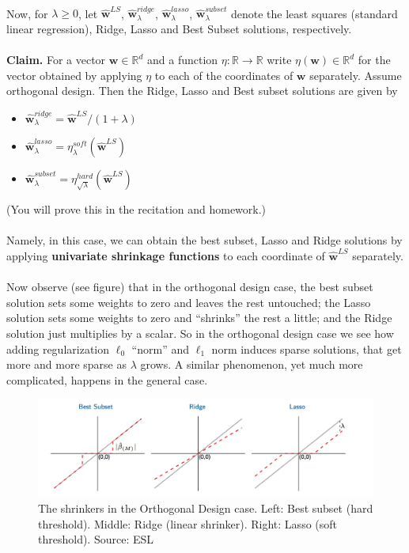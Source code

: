 \documentclass[11pt]{article}
\newcommand{\R}{\ensuremath{\mathbb{R}}}
\newcommand{\V}[1]{\mathbf{#1}}
\begin{document}
  ~\\
  Now, for $\lambda\geq 0$, let $\hat{\V{w}}^{LS}$, 
      $\hat{\V{w}}_\lambda^{ridge}$,
      $\hat{\V{w}}_\lambda^{lasso}$,
      $\hat{\V{w}}_\lambda^{subset}$
      denote the least squares (standard linear regression), Ridge, Lasso and
      Best Subset solutions, respectively.  
      \\~\\
      {\bf Claim.} 
      For a vector $\V{w}\in\R^d$ and a function $\eta:\R\to\R$ write 
      $\eta(\V{w})\in\R^d$ for the vector obtained by applying $\eta$ to each
      of the coordinates of $\V{w}$ separately.
      Assume orthogonal design. Then the Ridge, Lasso and Best
      subset solutions are given by 
      \begin{itemize}
        \item $\hat{\V{w}}_\lambda^{ridge} = \hat{\V{w}}^{LS} / (1+\lambda) $
        \item $\hat{\V{w}}_\lambda^{lasso} = \eta^{soft}_\lambda(\hat{\V{w}}^{LS})  $
        \item $\hat{\V{w}}_\lambda^{subset} = \eta^{hard}_{\sqrt{\lambda}}(\hat{\V{w}}^{LS})  $
      \end{itemize}
      (You will prove this in the recitation and homework.)
      \\~\\
      Namely, in this case, we can obtain the best subset, Lasso and Ridge
      solutions by applying {\bf univariate shrinkage functions} to each
      coordinate of $\hat{\V{w}}^{LS}$ separately. 
\\~\\
      Now observe (see figure) that in the orthogonal design case, 
      the best subset solution sets some weights to zero and leaves the rest
      untouched; the Lasso solution sets some weights to zero and ``shrinks''
      the rest a little; and the Ridge solution just multiplies by a scalar. So
      in the orthogonal design case we see how adding regularization 
      $\ell_0$ ``norm'' and $\ell_1$ norm induces sparse solutions, that get
      more and more sparse as $\lambda$ grows. A similar phenomenon, yet much
      more complicated, happens in the general case.
\begin{figure}[H]
      \centering
      \includegraphics[width=6in]{orthogonal_design_shrink.jpeg}
      \caption{The shrinkers in the Orthogonal Design case. Left: Best subset
        (hard threshold). Middle: Ridge (linear shrinker). Right: Lasso (soft
        threshold).
      Source: ESL}
    \end{figure}
\end{document}

